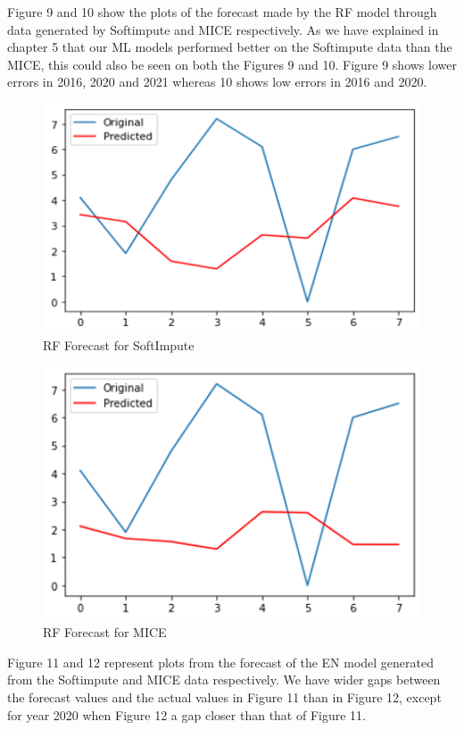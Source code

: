 \documentclass[12pt,italian, twoside]{report}
\begin{document}
Figure 9 and 10 show the plots of the forecast made by the RF model through data generated by Softimpute and MICE respectively. As we have explained in chapter 5 that our ML models performed better on the Softimpute data than the MICE, this could also be seen on both the Figures 9 and 10. Figure 9 shows lower errors in 2016, 2020 and 2021 whereas 10 shows low errors in 2016 and 2020.\\
\begin{figure}[t]
	\centering
	\includegraphics[width = 130mm]{immagini/RF.png}
	\caption{RF Forecast for SoftImpute}
	\label{fig: RF_softimpute}
\end{figure}
\begin{figure}[t]
	\centering
	\includegraphics[width = 130mm]{immagini/RF1.png}
	\caption{RF Forecast for MICE}
	\label{fig:RF_MICE}
\end{figure}
Figure 11 and 12 represent plots from the forecast of the EN model generated from the Softimpute and MICE data respectively. We have wider gaps between the forecast values and the actual values in Figure 11 than in Figure 12, except for year 2020 when Figure 12 a gap closer than that of Figure 11.\\
\end{document}
